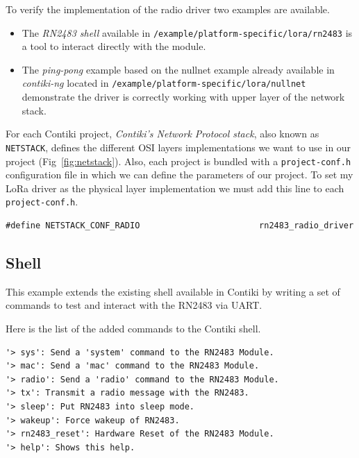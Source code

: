 
To verify the implementation of the radio driver two examples are available.

\begin{itemize}
  \item The \emph{RN2483 shell} available in
    \lstinline{/example/platform-specific/lora/rn2483} is a tool to interact
    directly with the module.
  \item The \emph{ping-pong} example based on the nullnet example already
    available in \emph{contiki-ng} located in 
    \lstinline{/example/platform-specific/lora/nullnet} demonstrate the driver
    is correctly working with upper layer of the network stack.
\end{itemize}

For each Contiki project, \emph{Contiki's Network Protocol stack}, also known
as \lstinline{NETSTACK}, defines the different OSI layers implementations we 
want to use in our project (Fig~\ref{fig:netstack}).
Also, each project is bundled with a \lstinline{project-conf.h}
configuration file in which we can define the parameters of our project. 
To set my LoRa driver as the physical layer implementation we must add this line to
each \lstinline{project-conf.h}.

\begin{lstlisting}
#define NETSTACK_CONF_RADIO                        rn2483_radio_driver
\end{lstlisting}



\subsection{Shell}

This example extends the existing shell available in Contiki by writing a set
of commands to test and interact with the RN2483 via UART\@.

Here is the list of the added commands to the Contiki shell.

\begin{lstlisting}
'> sys': Send a 'system' command to the RN2483 Module.
'> mac': Send a 'mac' command to the RN2483 Module.
'> radio': Send a 'radio' command to the RN2483 Module.
'> tx': Transmit a radio message with the RN2483.
'> sleep': Put RN2483 into sleep mode.
'> wakeup': Force wakeup of RN2483.
'> rn2483_reset': Hardware Reset of the RN2483 Module.
'> help': Shows this help.
\end{lstlisting}

